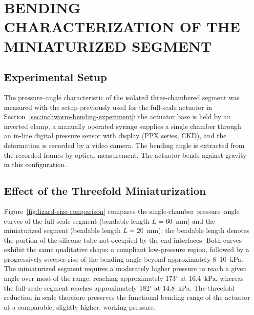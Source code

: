 

\section{BENDING CHARACTERIZATION OF THE MINIATURIZED SEGMENT}
\label{sec:lizard-characterization}

\subsection{Experimental Setup}

The pressure--angle characteristic of the isolated three-chambered
segment was measured with the setup previously used for the full-scale
actuator in Section~\ref{sec:inchworm-bending-experiment}: the actuator base is held by
an inverted clamp, a manually operated syringe supplies a single chamber
through an in-line digital pressure sensor with display (PPX series,
CKD), and the deformation is recorded by a video camera. The bending
angle is extracted from the recorded frames by optical measurement. The
actuator bends against gravity in this configuration.

\subsection{Effect of the Threefold Miniaturization}

Figure~\ref{fig:lizard-size-comparison} compares the single-chamber
pressure--angle curves of the full-scale segment (bendable length
$L = 60$~mm) and the miniaturized segment (bendable length $L = 20$~mm);
the bendable length denotes the portion of the
silicone tube not occupied by the end interfaces. Both curves exhibit the
same qualitative shape: a compliant low-pressure region, followed by a
progressively steeper rise of the bending angle beyond approximately
8--10~kPa. The miniaturized segment requires a moderately higher pressure
to reach a given angle over most of the range, reaching approximately
173$^{\circ}$ at 16.4~kPa, whereas the full-scale segment reaches
approximately 182$^{\circ}$ at 14.8~kPa. The threefold reduction in scale
therefore preserves the functional bending range of the actuator at a
comparable, slightly higher, working pressure.


